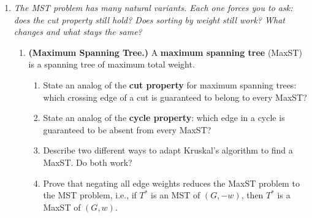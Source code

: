 \documentclass[9pt]{book}
\begin{document}
\begin{enumerate}[label=\arabic*.]
\begin{enumerate}
    \item \textbf{(What if weights are not distinct?)}
    Without distinct weights, an MST may not be unique.
    \begin{enumerate}
        \item Give a graph on 3 vertices $\{a, b, c\}$ with equal-weight edges where there are multiple MSTs.
        \item Does Kruskal's still always produce \emph{an} MST (not necessarily the unique one)? Argue briefly why or why not.
        \item Does the cycle property still hold verbatim (``the maximum-weight edge in any cycle is in \emph{no} MST'')? If not, state the correct version.
    \end{enumerate}
\end{enumerate}


\item \textit{The MST problem has many natural variants. Each one forces you to ask: does the cut property still hold? Does sorting by weight still work? What changes and what stays the same?}

\begin{enumerate}

    \item \textbf{(Maximum Spanning Tree.)}
    A \textbf{maximum spanning tree} (MaxST) is a spanning tree of maximum total weight.
    \begin{enumerate}
        \item State an analog of the \textbf{cut property} for maximum spanning trees: which crossing edge of a cut is guaranteed to belong to every MaxST?
        \item State an analog of the \textbf{cycle property}: which edge in a cycle is guaranteed to be absent from every MaxST?
        \item Describe two different ways to adapt Kruskal's algorithm to find a MaxST. Do both work?
        \item Prove that negating all edge weights reduces the MaxST problem to the MST problem, i.e., if $T^*$ is an MST of $(G, -w)$, then $T^*$ is a MaxST of $(G, w)$.
    \end{enumerate}


\end{enumerate}
\end{enumerate}
\end{document}
